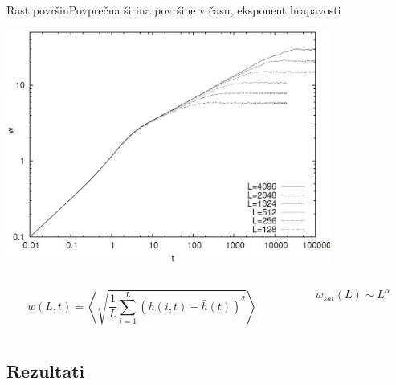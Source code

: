 \documentclass{beamer}
\begin{document}
\begin{frame}{Rast površin}{Povprečna širina površine v času, eksponent hrapavosti}
\begin{center}
  \footnotesize
  \includegraphics[width=0.8\textwidth]{slike/sirine-vmesnika}

\begin{columns}
  \begin{column}{0.6\textwidth}
    \begin{equation} w(L,t) = \left\langle \sqrt{\frac{1}{L} \sum_{i=1}^L (h(i,t)-\bar{h}(t))^2} \right\rangle \end{equation}
  \end{column}
  \begin{column}{0.4\textwidth}
    \begin{equation} w_{sat}(L) \sim L^\alpha \end{equation}
  \end{column}
\end{columns}
\end{center}
\end{frame}


\subsection{Rezultati}
\end{document}
